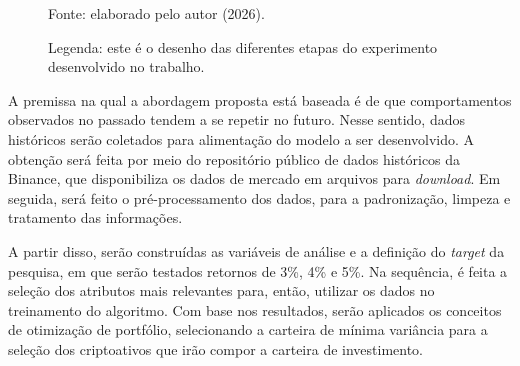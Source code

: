 \begin{figure}[htbp]
\begin{minipage}{\textwidth}
{%
        }

        \vspace{2mm}
        {\raggedright\fontsize{10}{12}\selectfont Fonte: elaborado pelo autor (2026).\par}
        {\raggedright\fontsize{10}{12}\selectfont Legenda: este é o desenho das diferentes etapas do experimento desenvolvido no trabalho.\par}
    \end{minipage}
\end{figure}

A premissa na qual a abordagem proposta está baseada é de que comportamentos observados no passado tendem a se repetir no futuro. Nesse sentido, dados históricos serão coletados para alimentação do modelo a ser desenvolvido. A obtenção será feita por meio do repositório público de dados históricos da Binance, que disponibiliza os dados de mercado em arquivos para \textit{download}. Em seguida, será feito o pré-processamento dos dados, para a padronização, limpeza e tratamento das informações.

A partir disso, serão construídas as variáveis de análise e a definição do \textit{target} da pesquisa, em que serão testados retornos de 3\%, 4\% e 5\%. Na sequência, é feita a seleção dos atributos mais relevantes para, então, utilizar os dados no treinamento do algoritmo. Com base nos resultados, serão aplicados os conceitos de otimização de portfólio, selecionando a carteira de mínima variância para a seleção dos criptoativos que irão compor a carteira de investimento.

